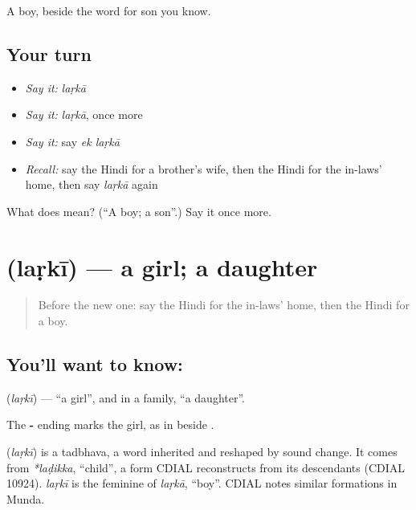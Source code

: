 \begin{grammarlens}[title={What you've built}]
A boy, beside the word for son you know.
\end{grammarlens}

\subsection*{Your turn}
\begin{itemize}
\raggedright
  \item \emph{Say it:} \emph{laṛkā}
  \item \emph{Say it:} \emph{laṛkā}, once more
  \item \emph{Say it:} say \emph{ek laṛkā}
  \item \emph{Recall:} say the Hindi for a brother's wife, then the Hindi for the in-laws' home, then say \emph{laṛkā} again
\end{itemize}

\begin{tcolorbox}[breakable,colback=teal!4,colframe=teal!35!black,title={Before you move on}]
What does  mean? (\textquotedblleft{}A boy; a son\textquotedblright{}.) Say it once more.
\end{tcolorbox}
\section[\texorpdfstring{\hi{लड़की} (laṛkī)}{लड़की (laṛkī)}]{ (laṛkī) — a girl; a daughter}

\label{lesson:HI-C118-larki}



\begin{quote}
Before the new one: say the Hindi for the in-laws' home, then the Hindi for a boy.
\end{quote}

\subsection*{You'll want to know: }
\textbf{} (\emph{laṛkī}) — \textquotedblleft{}a girl\textquotedblright{}, and in a family, \textquotedblleft{}a daughter\textquotedblright{}.

The \textbf{-} ending marks the girl, as in \textbf{} beside \textbf{}.

\begin{cousinweb}
\textbf{} (\emph{laṛkī}) is a tadbhava, a word inherited and reshaped by sound change. It comes from \emph{*laḍikka}, \textquotedblleft{}child\textquotedblright{}, a form CDIAL reconstructs from its descendants (CDIAL 10924). \emph{laṛkī} is the feminine of \emph{laṛkā}, \textquotedblleft{}boy\textquotedblright{}. CDIAL notes similar formations in Munda.
\end{cousinweb}


